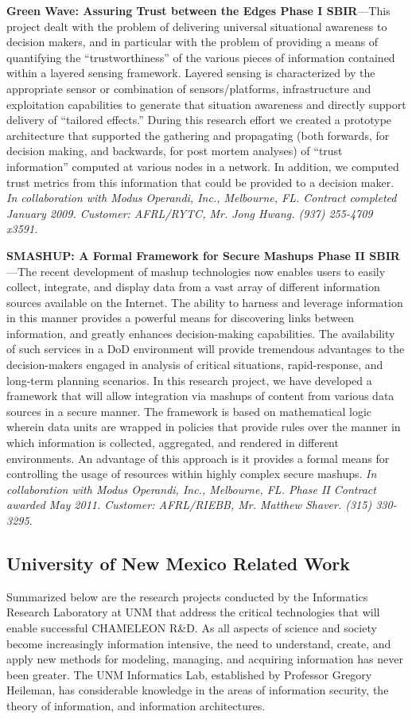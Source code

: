 \documentclass{sbir}
\begin{document}
{\bf Green Wave: Assuring Trust between the Edges Phase I SBIR}---This project dealt with the problem of delivering universal situational awareness to decision makers, and in particular with the problem of providing a means of quantifying the ``trustworthiness'' of the various pieces of information contained within a layered sensing framework. Layered sensing is characterized by the appropriate sensor or combination of sensors/platforms, infrastructure and exploitation capabilities to generate that situation awareness and directly support delivery of ``tailored effects.'' During this research effort we created a prototype architecture that supported the gathering and propagating (both forwards, for decision making, and backwards, for post mortem analyses) of ``trust information'' computed at various nodes in a network. In addition, we computed trust metrics from this information that could be provided to a decision maker. \emph{In collaboration with Modus Operandi, Inc., Melbourne, FL. Contract completed January 2009. Customer: AFRL/RYTC, Mr. Jong Hwang. (937) 255-4709 x3591}.

{\bf SMASHUP: A Formal Framework for Secure Mashups Phase II SBIR}---The recent development of mashup technologies now enables users to easily collect, integrate, and display data from a vast array of different information sources available on the Internet. The ability to harness and leverage information in this manner provides a powerful means for discovering links between information, and greatly enhances decision-making capabilities. The availability of such services in a DoD environment will provide tremendous advantages to the decision-makers engaged in analysis of critical situations, rapid-response, and long-term planning scenarios. In this research project, we have developed a framework that will allow integration via mashups of content from various data sources in a secure manner. The framework is based on mathematical logic wherein data units are wrapped in policies that provide rules over the manner in which information is collected, aggregated, and rendered in different environments. An advantage of this approach is it provides a formal means for controlling the usage of resources within highly complex secure mashups. \emph{In collaboration with Modus Operandi, Inc., Melbourne, FL. Phase II Contract awarded May 2011. Customer: AFRL/RIEBB, Mr. Matthew Shaver. (315) 330-3295}.

\subsection{University of New Mexico Related Work}
Summarized below are the research projects conducted by the Informatics Research Laboratory at UNM that address the critical technologies that will enable successful CHAMELEON R\&D. As all aspects of science and society become increasingly information intensive, the need to understand, create, and apply new methods for modeling, managing, and acquiring information has never been greater. The UNM Informatics Lab, established by Professor Gregory Heileman, has considerable knowledge in the areas of information security, the theory of information, and information architectures.
\end{document}

